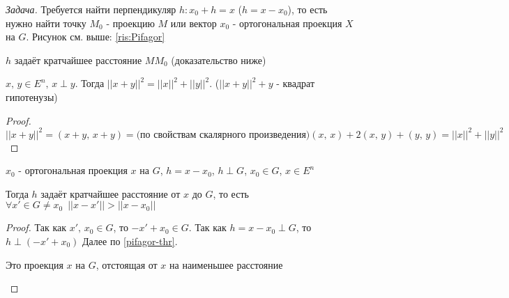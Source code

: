 
\textit{Задача.  } Требуется найти перпендикуляр $h: x_0 + h = x$ ($h = x - x_0$), то есть нужно найти точку $M_0$ - 
проекцию $M$ или вектор $x_0$ - ортогональная проекция $X$ на $G$. Рисунок см. выше: \ref{ris:Pifagor}

\begin{remark}
    $h$ задаёт кратчайшее расстояние $MM_0$ (доказательство ниже)
\end{remark}

\begin{lemma}
    $x, \, y \in E^n, \, x \perp y.$ Тогда $||x+y||^2 = ||x||^2 + ||y||^2$. ($||x+y||^2+y$ - квадрат гипотенузы)
\end{lemma}

\begin{proof}
    $||x+y||^2 = (x+y, \, x+y) = \text{(по свойствам скалярного произведения)} (x, \, x) + 2(x, \, y) + (y, \, y) = ||x||^2 + ||y||^2$
\end{proof}

\begin{theorem}
    $x_0$ - ортогональная проекция $x$ на $G$, $h=x-x_0$, $h \perp G$, $x_0 \in G$, $x \in E^n$
    
    Тогда $h$ задаёт кратчайшее расстояние от $x$ до $G$, то есть $\forall x' \in G \neq x_0 \,\,\, ||x-x'|| > ||x-x_0||$ 
\end{theorem}
\begin{proof}
    Так как $x', \, x_0 \in G$, то $-x'+x_0 \in G$. Так как $h = x - x_0 \perp G$, то $h \perp (-x' + x_0)$
    Далее по \ref{pifagor-thr}.
    \begin{remark}
        Это проекция $x$ на $G$, отстоящая от $x$ на наименьшее расстояние
    \end{remark}
\end{proof}